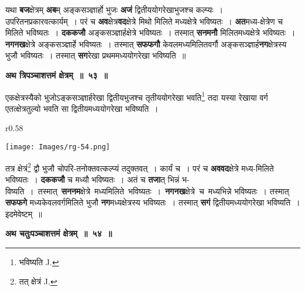 \documentclass[11pt, openany]{book}
\begin{document}
 यथा \textbf{बज}क्षेत्रम् \textbf{अब}म् अङ्कसञ्ज्ञार्हो भुजः \textbf{अजं} द्वितीययोगरेखाभुजश्च कल्प्यः~। \\

 उपरितनप्रकारवत्कार्यम्~। परं च \textbf{अव}क्षेत्र\textbf{वद}क्षेत्रे मिथो मिलिते मध्यक्षेत्रे भविष्यतः~। \textbf{अत}मध्य-क्षेत्रेण च मिलिते भविष्यतः~। \textbf{दककजौ} अङ्कसञ्ज्ञार्हक्षेत्रे भविष्यतः~। तस्मात् \textbf{सनमनौ} मिलितमध्यक्षेत्रे भविष्यतः~। \textbf{नगनख}क्षेत्रे अङ्कसञ्ज्ञार्हे भविष्यतः~। तस्मात् \textbf{सफफगौ} केवलमध्यमिलितवर्गौ अङ्कसञ्ज्ञार्ह\textbf{नग}क्षेत्रस्य भुजौ भविष्यतः~। तस्मात् \textbf{सग}रेखा प्रथममध्ययोगरेखा भविष्यति~॥
\vspace{2mm}

\begin{center}
\textbf{\large अथ त्रिपञ्चाशत्तमं क्षेत्रम्~॥~५३~॥} 
\end{center}

 {\ab एकक्षेत्रस्यैको भुजोऽङ्कसञ्ज्ञार्हरेखा द्वितीयभुजश्च तृतीययोगरेखा भवति\renewcommand{\thefootnote}{१}\footnote{भविष्यति {\en J.}} तदा यस्या रेखाया वर्ग एतत्क्षेत्रतुल्यो भवति सा द्वितीयमध्ययोगरेखा भविष्यति~।} \\

\begin{wrapfigure}{r}{0.58\textwidth}
\vspace{-14mm}
\begin{flushright}
\texttt{[image: Images/rg-54.png]}
\end{flushright}
\vspace{-8mm}
\end{wrapfigure}

 तत्र क्षेत्रं\renewcommand{\thefootnote}{२}\footnote{तत् क्षेत्रं {\en J.}} द्वौ भुजौ चोपरि-तनोक्तवत्कल्प्यं तदुक्तवत्~। कार्यं च~। परं च   \textbf{अववद}क्षेत्रे मध्य-मिलिते भविष्यतः~। \textbf{दककजौ} च मध्यौ भविष्यतः~। अतं  च \textbf{तजा}त् भिन्नं भ-\\

\newpage
\noindent विष्यति~। \,तस्मात् \,\textbf{सननम}क्षेत्रे \,मध्यमिलिते \,भविष्यतः~। \,\textbf{नगनख}क्षेत्रे \,च \,मध्यभिन्ने भविष्यतः~। तस्मात् \textbf{सफफगे} मध्यकेवलवर्गमिलिते भुजौ \textbf{नग}मध्यक्षेत्रस्य भविष्यतः~। तस्मात् \textbf{सगं} द्वितीयमध्ययोगरेखा भविष्यति~। इदमेवेष्टम्~॥ 
\vspace{2mm}

\begin{center}
\textbf{\large अथ चतुःपञ्चाशत्तमं क्षेत्रम्~॥~५४~॥} 
\end{center}
\end{document}
